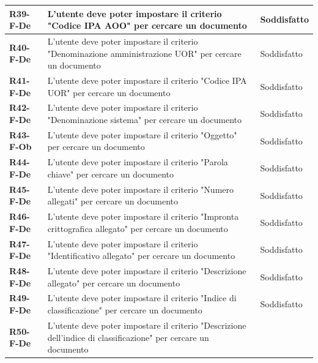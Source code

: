 \documentclass[a4paper,12pt]{article}
\begin{document}
{{{\begin{longtable}{|>{\centering\arraybackslash}m{}|>{\centering\arraybackslash}m{}|>{\centering\arraybackslash}m{}|}
                \hline
                \textbf{R39-F-De} & L'utente deve poter impostare il criterio "Codice IPA AOO" per cercare un documento & 
                Soddisfatto \\
                \hline
                \textbf{R40-F-De} & L'utente deve poter impostare il criterio "Denominazione amministrazione UOR" per cercare un documento & 
                Soddisfatto \\
                \hline
                \textbf{R41-F-De} & L'utente deve poter impostare il criterio "Codice IPA UOR" per cercare un documento & 
                Soddisfatto \\
                \hline
                \textbf{R42-F-De} & L'utente deve poter impostare il criterio "Denominazione sistema" per cercare un documento & 
                Soddisfatto \\ 
                \hline
                \textbf{R43-F-Ob} & L'utente deve poter impostare il criterio "Oggetto" per cercare un documento & 
                Soddisfatto \\ 
                \hline
                \textbf{R44-F-De} & L'utente deve poter impostare il criterio "Parola chiave" per cercare un documento & 
                Soddisfatto \\ 
                \hline
                \textbf{R45-F-De} & L'utente deve poter impostare il criterio "Numero allegati" per cercare un documento & 
                Soddisfatto \\ 
                \hline
                \textbf{R46-F-De} & L'utente deve poter impostare il criterio "Impronta crittografica allegato" per cercare un documento & 
                Soddisfatto \\ 
                \hline
                \textbf{R47-F-De} & L'utente deve poter impostare il criterio "Identificativo allegato" per cercare un documento & 
                Soddisfatto \\ 
                \hline
                \textbf{R48-F-De} & L'utente deve poter impostare il criterio "Descrizione allegato" per cercare un documento & 
                Soddisfatto \\ 
                \hline
                \textbf{R49-F-De} & L'utente deve poter impostare il criterio "Indice di classificazione" per cercare un documento & 
                Soddisfatto \\ 
                \hline
                \textbf{R50-F-De} & L'utente deve poter impostare il criterio "Descrizione dell'indice di classificazione" per cercare un documento & 

\end{longtable}}}}
\end{document}
